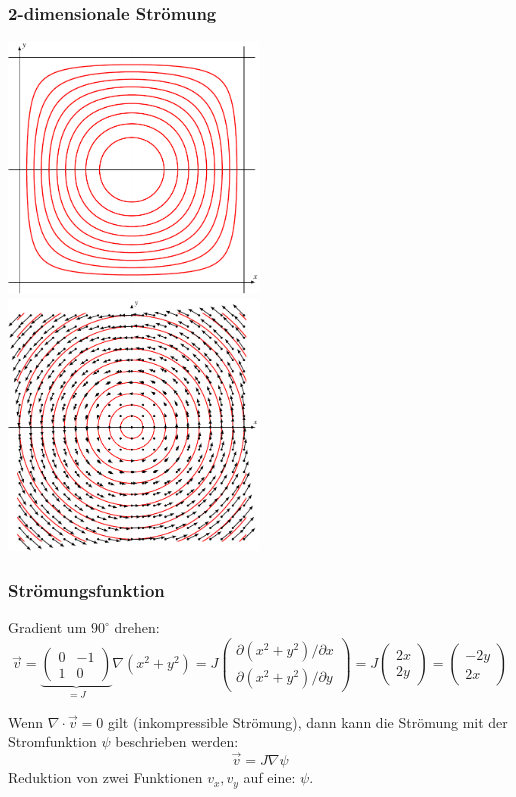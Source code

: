 %
%
\begin{frame}
\frametitle{2-dimensionale Strömung}
\begin{center}
\includegraphics[width=0.5\textwidth]{../../skript/chapters/2/konvektion.pdf}
\includegraphics[width=0.5\textwidth]{../../skript/chapters/2/rotation.pdf}
\end{center}
\end{frame}

\begin{frame}
\frametitle{Strömungsfunktion}
\begin{rot}
Gradient um $90^\circ$ drehen:
\[
\vec v
=
\underbrace{\begin{pmatrix}0&-1\\1&0\end{pmatrix}}_{\displaystyle=J}
\nabla (x^2+y^2)
=
J
\begin{pmatrix}
\partial (x^2+y^2)/\partial x\\
\partial (x^2+y^2)/\partial y
\end{pmatrix}
=
J
\begin{pmatrix}
2x\\2y
\end{pmatrix}
=
\begin{pmatrix}-2y\\2x\end{pmatrix}
\]
\end{rot}
\pause
\begin{sfkt}
Wenn $\nabla\cdot\vec v=0$ gilt (inkompressible Strömung), dann kann die
Strömung mit der Stromfunktion $\psi$ beschrieben werden:
\[
\vec v = J \nabla\psi
\]
Reduktion von zwei Funktionen $v_x,v_y$ auf eine: $\psi$.
\end{sfkt}

\end{frame}

